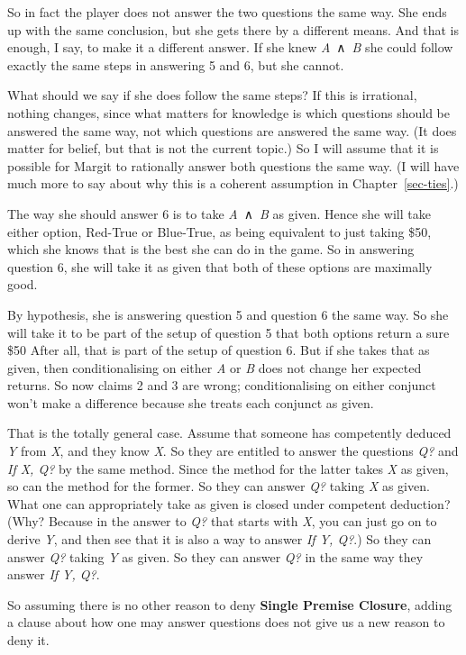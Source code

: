 \documentclass[
  10pt,
  letterpaper,
  twoside]{scrbook}
\begin{document}
So in fact the player does not answer the two questions the same way.
She ends up with the same conclusion, but she gets there by a different
means. And that is enough, I say, to make it a different answer. If she
knew \emph{A}~∧~\emph{B} she could follow exactly the same steps in
answering 5 and 6, but she cannot.

What should we say if she does follow the same steps? If this is
irrational, nothing changes, since what matters for knowledge is which
questions should be answered the same way, not which questions are
answered the same way. (It does matter for belief, but that is not the
current topic.) So I will assume that it is possible for Margit to
rationally answer both questions the same way. (I will have much more to
say about why this is a coherent assumption in Chapter~\ref{sec-ties}.)

The way she should answer 6 is to take \emph{A}~∧~\emph{B} as given.
Hence she will take either option, Red-True or Blue-True, as being
equivalent to just taking \$50, which she knows that is the best she can
do in the game. So in answering question 6, she will take it as given
that both of these options are maximally good.

By hypothesis, she is answering question 5 and question 6 the same way.
So she will take it to be part of the setup of question 5 that both
options return a sure \$50 After all, that is part of the setup of
question 6. But if she takes that as given, then conditionalising on
either \emph{A} or \emph{B} does not change her expected returns. So now
claims 2 and 3 are wrong; conditionalising on either conjunct won't make
a difference because she treats each conjunct as given.

That is the totally general case. Assume that someone has competently
deduced \emph{Y} from \emph{X}, and they know \emph{X}. So they are
entitled to answer the questions \emph{Q?} and \emph{If X, Q?} by the
same method. Since the method for the latter takes \emph{X} as given, so
can the method for the former. So they can answer \emph{Q?} taking
\emph{X} as given. What one can appropriately take as given is closed
under competent deduction? (Why? Because in the answer to \emph{Q?} that
starts with \emph{X}, you can just go on to derive \emph{Y}, and then
see that it is also a way to answer \emph{If Y, Q?}.) So they can answer
\emph{Q?} taking \emph{Y} as given. So they can answer \emph{Q?} in the
same way they answer \emph{If Y, Q?}.

So assuming there is no other reason to deny \textbf{Single Premise
Closure}, adding a clause about how one may answer questions does not
give us a new reason to deny it.
\end{document}
